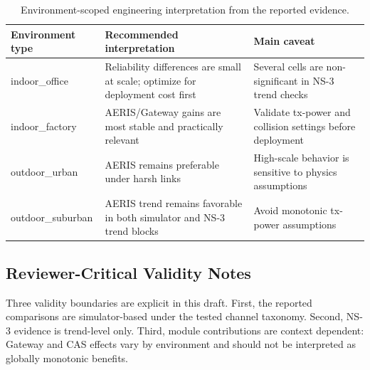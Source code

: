 \documentclass[sensors,article,submit,moreauthors,pdftex]{Definitions/mdpi}
\begin{document}
\begin{table}[H]
\caption{Environment-scoped engineering interpretation from the reported evidence.}
\label{tab:deployment_summary}
\centering
\small
\begin{tabular}{p{} p{} p{}}
\toprule
Environment type & Recommended interpretation & Main caveat \\
\midrule
indoor\_office & Reliability differences are small at scale; optimize for deployment cost first & Several cells are non-significant in NS-3 trend checks \\
indoor\_factory & AERIS/Gateway gains are most stable and practically relevant & Validate tx-power and collision settings before deployment \\
outdoor\_urban & AERIS remains preferable under harsh links & High-scale behavior is sensitive to physics assumptions \\
outdoor\_suburban & AERIS trend remains favorable in both simulator and NS-3 trend blocks & Avoid monotonic tx-power assumptions \\
\bottomrule
\end{tabular}
\normalsize
\end{table}

\subsection*{Reviewer-Critical Validity Notes}
Three validity boundaries are explicit in this draft. First, the reported comparisons are simulator-based under the tested channel taxonomy. Second, NS-3 evidence is trend-level only. Third, module contributions are context dependent: Gateway and CAS effects vary by environment and should not be interpreted as globally monotonic benefits.
\end{document}
